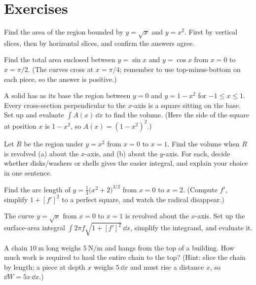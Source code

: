 \section{Exercises}
\label{ch26:exercises}

\begin{exercise}
Find the area of the region bounded by $y = \sqrt{x}$ and $y = x^2$. First by
vertical slices, then by horizontal slices, and confirm the answers agree.
\end{exercise}

\begin{exercise}
Find the total area enclosed between $y=\sin x$ and $y=\cos x$ from $x=0$ to
$x=\pi/2$. (The curves cross at $x=\pi/4$; remember to use top-minus-bottom on each
piece, so the answer is positive.)
\end{exercise}

\begin{exercise}
A solid has as its base the region between $y=0$ and $y = 1-x^2$ for $-1\le x\le 1$.
Every cross-section perpendicular to the $x$-axis is a square sitting on the base.
Set up and evaluate $\int A(x)\,\dd x$ to find the volume. (Here the side of the
square at position $x$ is $1-x^2$, so $A(x) = (1-x^2)^2$.)
\end{exercise}

\begin{exercise}
Let $R$ be the region under $y = x^2$ from $x=0$ to $x=1$. Find the volume when $R$
is revolved (a) about the $x$-axis, and (b) about the $y$-axis. For each, decide
whether disks/washers or shells gives the easier integral, and explain your choice
in one sentence.
\end{exercise}

\begin{exercise}
Find the arc length of $y = \tfrac{1}{3}\bigl(x^2+2\bigr)^{3/2}$ from $x=0$ to
$x=2$. (Compute $f'$, simplify $1+[f']^2$ to a perfect square, and watch the
radical disappear.)
\end{exercise}

\begin{exercise}
The curve $y=\sqrt{x}$ from $x=0$ to $x=1$ is revolved about the $x$-axis. Set up
the surface-area integral $\int 2\pi f\sqrt{1+[f']^2}\,\dd x$, simplify the
integrand, and evaluate it.
\end{exercise}

\begin{exercise}
A chain $10\ \text{m}$ long weighs $5\ \text{N/m}$ and hangs from the top of a
building. How much work is required to haul the entire chain to the top? (Hint:
slice the chain by length; a piece at depth $x$ weighs $5\,\dd x$ and must rise a
distance $x$, so $\dd W = 5x\,\dd x$.)
\end{exercise}

